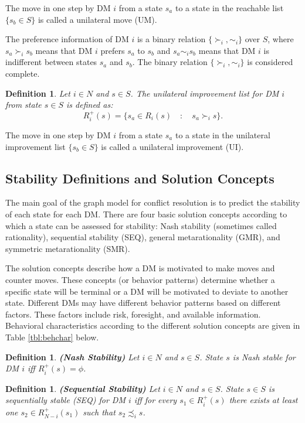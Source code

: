 \documentclass[letterpaper,12pt,titlepage,oneside,final]{book}
\newtheorem{definition}[lemma]{Definition}
\begin{document}
The move in one step by DM $i$ from a state $s_a$ to a state in the reachable list $\{s_b\in S\}$ is called a unilateral move (UM).

The preference information of DM $i$ is a binary relation $\{\succ_i,\sim_i\}$ over $S$, where $s_a\succ_i s_b$ means that DM $i$ prefers $s_a$ to $s_b$ and $s_a\sim_i s_b$ means that DM $i$ is indifferent between states $s_a$ and $s_b$. The binary relation $\{\succ_i,\sim_i\}$ is considered complete.

\begin{definition}
\rm
Let $i \in N$ and $s \in S$. The unilateral improvement list for DM $i$ from state $s \in S$ is defined as:
$$R_i^+(s)=\{s_a \in R_i(s) \quad : \quad s_a\succ_i s\}.$$
\end{definition}

The move in one step by DM $i$ from a state $s_a$ to a state in the unilateral improvement list $\{s_b\in S\}$ is called a unilateral improvement (UI).

\subsection{Stability Definitions and Solution Concepts}

The main goal of the graph model for conflict resolution is to predict the stability of each state for each DM. There are four basic solution concepts according to which a state can be assessed for stability: Nash stability (sometimes called rationality), sequential stability (SEQ), general metarationality (GMR), and  symmetric metarationality (SMR). 

The solution concepts describe how a DM is motivated to make moves and counter moves. These concepts (or behavior patterns) determine whether a specific state will be terminal or a DM will be motivated to deviate to another state. Different DMs may have different behavior patterns based on different factors. These factors include risk, foresight, and available information. Behavioral characteristics according to the different solution concepts are given in Table \ref{tbl:behchar} below. 

\begin{definition}
\rm {\bf (Nash Stability)} Let $i \in N$ and $s \in
S$. State $s$ is \emph{Nash stable} for DM $i$ \emph{iff} $R_i^+(s)=\phi$.
\end{definition}

\begin{definition}
\rm {\bf (Sequential Stability)} Let $i \in N$ and $s \in
S$. State $s \in S$ is \emph{sequentially stable} (\emph{SEQ}) for DM $i$ \emph{iff} for every $s_1 \in R_i^+(s)$ there exists at least one $s_2 \in R_{N-i}^+(s_1)$
such that $s_2 \precsim_i s$.
\end{definition}
\end{document}
